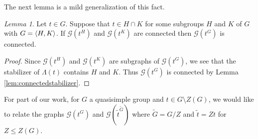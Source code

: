 \documentclass[11pt,a4paper]{amsart}
\theoremstyle{plain}
\theoremstyle{definition}
\theoremstyle{remark}
\newtheorem{lemma}[definition]{Lemma}
\newcounter{claim}[definition]
\theoremstyle{remark}
\theoremstyle{remark}
\theoremstyle{definition}
\newcommand{\GG}{\mathcal{G}}
\DeclarePairedDelimiter{\gen}{\langle}{\rangle}
\begin{document}
The next lemma is a mild generalization of this fact.

\begin{lemma}\label{lem:centralizermaximal} Let $t\in G$. Suppose that $t\in H\cap K$ for some subgroups $H$ and $K$ of $G$ with $G=\gen{H,K}$. If  $\GG(t^H)$ and $\GG(t^K)$ are connected then $\GG(t^G)$ is connected.%
\end{lemma}
\begin{proof} Since $\GG(t^H)$ and $\GG(t^K)$ are subgraphs of $\GG(t^G)$, we see that the stabilizer of $\Lambda(t)$ contains $H$ and $K$. Thus $\GG(t^G)$ is connected by Lemma \ref{lem:connectedstabilizer}.

\end{proof}






For part of our work, for $G$ a quasisimple group and $t \in G\setminus Z(G)$, we would like to relate the graphs $\GG(t^G)$ and $\GG(\tilde t^{\widetilde G})$ where $\widetilde G=G/Z$ and $\tilde{t}=Zt$ for $Z \le Z(G)$.
\end{document}
